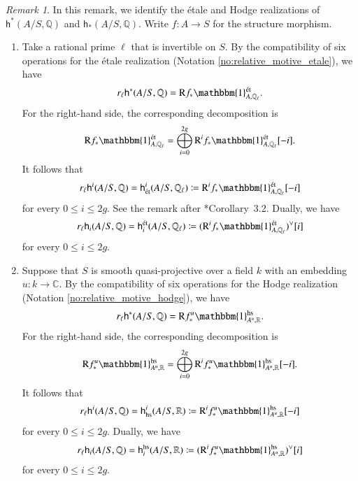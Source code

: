 \documentclass[12pt]{amsart}
\numberwithin{equation}{section}
\theoremstyle{plain}
\theoremstyle{definition}
\theoremstyle{remark}
\newtheorem{remark}[proposition]{Remark}
\renewcommand{\d}[1]{\mathbb{#1}}
\renewcommand{\r}[1]{\mathrm{#1}}
\renewcommand{\sf}[1]{\mathsf{#1}}
\renewcommand{\(}{\left(}
\renewcommand{\)}{\right)}
\renewcommand{\leq}{\leqslant}
\newcommand{\dC}{\d C}
\newcommand{\dQ}{\d Q}
\newcommand{\dR}{\d R}
\newcommand{\rR}{\r R}
\newcommand{\sfh}{\sf h}
\newcommand{\et}{{\acute{\r{e}}\r{t}}}
\newcommand{\hs}{\r{hs}}
\begin{document}
\begin{remark}\label{re:abelian_realization}
In this remark, we identify the \'{e}tale and Hodge realizations of $\sfh^*(A/S,\dQ)$ and $\sfh_*(A/S,\dQ)$. Write $f\colon A\to S$ for the structure morphism.
\begin{enumerate}
  \item Take a rational prime $\ell$ that is invertible on $S$. By the compatibility of six operations for the \'{e}tale realization (Notation \ref{no:relative_motive_etale}), we have
      \[
      r_\ell\sfh^*(A/S,\dQ)=\rR f_*\mathbbm{1}^\et_{A,\dQ_\ell}.
      \]
      For the right-hand side, the corresponding decomposition is
      \[
      \rR f_*\mathbbm{1}^\et_{A,\dQ_\ell}=\bigoplus_{i=0}^{2g}\rR^i f_*\mathbbm{1}^\et_{A,\dQ_\ell}[-i].
      \]
      It follows that
      \[
      r_\ell\sfh^i(A/S,\dQ)=\sfh^i_{\et}(A/S,\dQ_\ell)\coloneqq\rR^i f_*\mathbbm{1}^\et_{A,\dQ_\ell}[-i]
      \]
      for every $0\leq  i\leq 2g$. See the remark after \cite{DM91}*{Corollary~3.2}. Dually, we have
      \[
      r_\ell\sfh_i(A/S,\dQ)=\sfh_i^{\et}(A/S,\dQ_\ell)\coloneqq(\rR^i f_*\mathbbm{1}^\et_{A,\dQ_\ell})^\vee[i]
      \]
      for every $0\leq  i\leq 2g$.

  \item Suppose that $S$ is smooth quasi-projective over a field $k$ with an embedding $u\colon k\to \dC$. By the compatibility of six operations for the Hodge realization (Notation \ref{no:relative_motive_hodge}), we have
      \[
      r_\ell\sfh^*(A/S,\dQ)=\rR f^u_*\mathbbm{1}^\hs_{A^u,\dR}.
      \]
      For the right-hand side, the corresponding decomposition is
      \[
      \rR f^u_*\mathbbm{1}^\hs_{A^u,\dR}=\bigoplus_{i=0}^{2g}\rR^i f^u_*\mathbbm{1}^\hs_{A^u,\dR}[-i].
      \]
      It follows that
      \[
      r_\ell\sfh^i(A/S,\dQ)=\sfh^i_{\hs}(A/S,\dR)\coloneqq\rR^i f^u_*\mathbbm{1}^\hs_{A^u,\dR}[-i]
      \]
      for every $0\leq  i\leq 2g$. Dually, we have
      \[
      r_\ell\sfh_i(A/S,\dQ)=\sfh_i^{\hs}(A/S,\dR)\coloneqq(\rR^i f^u_*\mathbbm{1}^\hs_{A^u,\dR})^\vee[i]
      \]
      for every $0\leq  i\leq 2g$.
\end{enumerate}


\end{remark}
\end{document}
